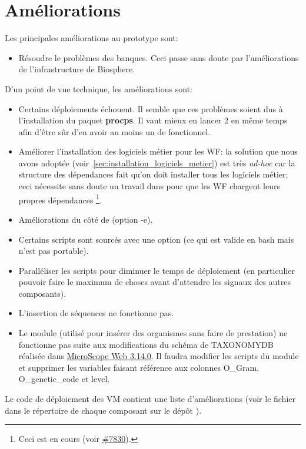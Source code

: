 \section{Améliorations}

Les principales améliorations au prototype sont:
\begin{itemize}
    \item Résoudre le problèmes des banques.
          Ceci passe sans doute par l'améliorations de l'infrastructure de Biosphere.
\end{itemize}


D'un point de vue technique, les améliorations sont:
\begin{itemize}
    \item Certains déploiements échouent.
          Il semble que ces problèmes soient dus à l'installation du paquet \textbf{procps}.
          Il vaut mieux en lancer 2 en même temps afin d'être sûr d'en avoir au moins un de fonctionnel.
    \item Améliorer l'installation des logiciels métier pour les WF:
          la solution que nous avons adoptée (voir~\autoref{sec:installation_logiciels_metier}) est très \textit{ad-hoc}
          car la structure des dépendances fait qu'on doit installer tous les logiciels métier;
          ceci nécessite sans doute un travail dans  pour que les WF chargent leurs propres dépendances
          \footnote{Ceci est en cours (voir \href{https://intranet.genoscope.cns.fr/agc/redmine/issues/7830}{\#7830}).}.
    \item Améliorations du côté de  (option -e).
    \item Certains scripts sont sourcés avec une option (ce qui est valide en bash mais n'est pas portable).
    \item Paralléliser les scripts pour diminuer le temps de déploiement (en particulier pouvoir faire le maximum de choses avant d'attendre les signaux des autres composants).
    \item L'insertion de séquences ne fonctionne pas.
    \item Le module  (utilisé pour insérer des organismes sans faire de prestation) ne fonctionne pas suite aux modifications du schéma de TAXONOMYDB réalisée dans \href{https://intranet.genoscope.cns.fr/agc/redmine/versions/142}{MicroScope Web 3.14.0}.
          Il faudra modifier les scripts du module et supprimer les variables faisant référence aux colonnes O\_Gram, O\_genetic\_code et level.
\end{itemize}

Le code de déploiement des VM contient une liste d'améliorations (voir le fichier  dans le répertoire de chaque composant sur le dépôt ).

